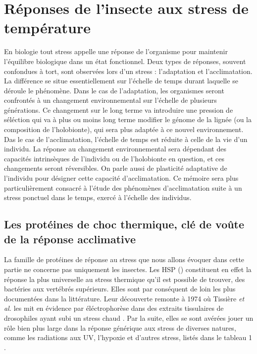 \chapter{Réponses de l'insecte aux stress de température}

En biologie tout stress appelle une réponse de l'organisme pour maintenir l'équilibre biologique dans un état fonctionnel.
Deux types de réponses, souvent confondues à tort, sont observées lors d'un stress : l'adaptation et l'acclimatation.
La différence se situe essentiellement sur l'échelle de temps durant laquelle se déroule le phénomène.
Dans le cas de l'adaptation, les organismes seront confrontés à un changement environnemental sur l'échelle de plusieurs générations.
Ce changement sur le long terme va introduire une pression de séléction qui va à plus ou moins long terme modifier le génome de la lignée (ou la composition de l'holobionte), qui sera plus adaptée à ce nouvel environnement.
Das le cas de l'acclimatation, l'échelle de temps est réduite à celle de la vie d'un individu. La réponse au changement environnemental sera dépendant des capacités intrinsèques de l'individu ou de l'holobionte en question, et ces changements seront réversibles.
On parle aussi de plasticité adaptative de l'individu pour désigner cette capacité d'acclimatation.
Ce mémoire sera plus particulièrement consacré à l'étude des
phénomènes d'acclimatation suite à un stress ponctuel dans le temps, exercé à l'échelle des individus.

	\section{Les protéines de choc thermique, clé de voûte de la réponse acclimative}

	La famille de protéines de réponse au stress que nous allons évoquer dans cette partie ne concerne pas uniquement les insectes.
	Les HSP () constituent en effet la réponse la plus universelle au stress thermique qu'il est possible de trouver, des bactéries aux vertébrés supérieurs.
	Elles sont par conséquent de loin les plus documentées dans la littérature.
	Leur découverte remonte à 1974 où Tissière \textit{et al.} les mit en évidence par éléctrophorèse dans des extraits tissulaires de drosophiles ayant subi un stress chaud \cite{tissieres1974}.
	Par la suite, elles se sont avérées jouer un rôle bien plus large dans la réponse générique aux stress de diverses natures, comme les radiations aux UV, l'hypoxie et d'autres stress, listés dans le tableau 1 \cite{sorensen2003}.

